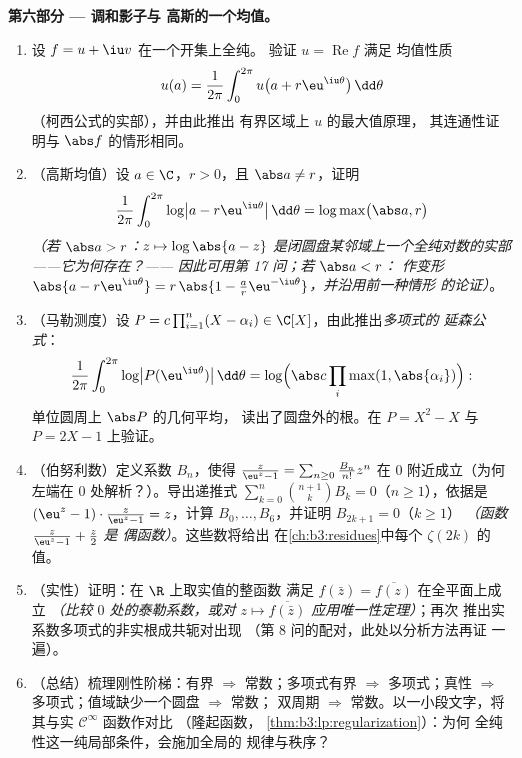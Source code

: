 \begin{problem}
\medskip
\noindent\textbf{第六部分 --- 调和影子与
高斯的一个均值。}
\begin{enumerate}[resume]
  \item 设 $f = u + \iu v$ 在一个开集上全纯。
        验证 $u = \operatorname{Re}f$ 满足
        均值性质
        \[
        u(a) = \frac1{2\pi}\int_0^{2\pi}
        u\bigl(a + r\eu^{\iu\theta}\bigr)\,\dd\theta
        \]
        （柯西公式的实部），并由此推出
        有界区域上 $u$ 的最大值原理，
        其连通性证明与 $\abs f$ 的情形相同。
  \item （高斯均值）设 $a \in \C$，$r > 0$，且
        $\abs a \neq r$，证明
        \[
        \frac1{2\pi}\int_0^{2\pi}
        \log\bigl|a - r\eu^{\iu\theta}\bigr|\,\dd\theta
        = \log\max\bigl(\abs a, r\bigr)
        \]
        \emph{（若 $\abs a > r$：$z \mapsto \log\abs{a - z}$
        是闭圆盘某邻域上一个全纯对数的实部
        ——它为何存在？——
        因此可用第 17 问；若 $\abs a < r$：
        作变形 $\abs{a - r\eu^{\iu\theta}} = r\,\abs{1 -
        \frac ar\eu^{-\iu\theta}}$，并沿用前一种情形
        的论证）}。
  \item （马勒测度）设 $P = c\prod_{i=1}^n(X -
        \alpha_i) \in \C[X]$，由此推出\emph{多项式的
        延森公式}：
        \[
        \frac1{2\pi}\int_0^{2\pi}\log\bigl|P(\eu^{\iu\theta})
        \bigr|\,\dd\theta
        = \log\Bigl(\abs c\prod_{i}\max(1,
        \abs{\alpha_i})\Bigr) :
        \]
        单位圆周上 $\abs P$ 的几何平均，
        读出了圆盘外的根。在 $P =
        X^2 - X$ 与 $P = 2X - 1$ 上验证。
  \item （伯努利数）定义系数 $B_n$，使得
        $\frac{z}{\eu^z - 1} = \sum_{n\geq0}\frac{B_n}{n!}
        z^n$ 在 $0$ 附近成立（为何左端在
        $0$ 处解析？）。导出递推式
        $\sum_{k=0}^{n}\binom{n+1}kB_k = 0$（$n \geq 1$），依据是
        $(\eu^z - 1)\cdot\frac z{\eu^z-1} = z$，计算 $B_0,
        \dots, B_6$，并证明 $B_{2k+1} = 0$（$k \geq 1$）
        \emph{（函数 $\frac z{\eu^z-1} + \frac z2$ 是
        偶函数）}。这些数将给出
        在\cref{ch:b3:residues}中每个 $\zeta(2k)$ 的值。
  \item （实性）证明：在 $\R$ 上取实值的整函数
        满足 $f(\bar z) =
        \overline{f(z)}$ 在全平面上成立 \emph{（比较
        $0$ 处的泰勒系数，或对
        $z \mapsto \overline{f(\bar z)}$ 应用唯一性定理）}；再次
        推出实系数多项式的非实根成共轭对出现
        （第 8 问的配对，此处以分析方法再证
        一遍）。
  \item （总结）梳理刚性阶梯：有界
        $\Rightarrow$ 常数；多项式有界
        $\Rightarrow$ 多项式；真性 $\Rightarrow$
        多项式；值域缺少一个圆盘 $\Rightarrow$ 常数；
        双周期 $\Rightarrow$ 常数。以一小段文字，将其与实
        $\mathcal C^\infty$ 函数作对比
        （隆起函数，
        \cref{thm:b3:lp:regularization}）：为何
        全纯性这一纯局部条件，会施加全局的
        规律与秩序？
\end{enumerate}


\end{problem}
